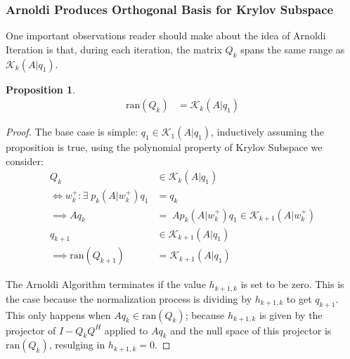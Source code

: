\documentclass[]{article}
\theoremstyle{definition}
\newtheorem{prop}{Proposition}
\begin{document}
        \subsubsection{Arnoldi Produces Orthogonal Basis for Krylov Subspace}
            One important observations reader should make about the idea of Arnoldi Iteration is that, during each iteration, the matrix $Q_k$ spans the same range as $\mathcal K_k(A|q_1)$. 
            \begin{prop}
                \begin{align}
                    \text{ran}(Q_k) &= \mathcal K_k(A|q_1)
                \end{align}
            \end{prop}
            \begin{proof}
                The base case is simple: $q_1 \in \mathcal K_1(A|q_1)$, inductively assuming the proposition is true, using the polynomial property of Krylov Subspace we consider: 
                $$
                \begin{aligned}
                    Q_k &\in \mathcal K_k(A|q_1)
                    \\
                    \iff w_k^+: \exists\; p_k(A|w_k^+)q_1 &= q_k
                    \\
                    \implies Aq_k &= \; Ap_k(A|w_k^+)q_1 \in \mathcal K_{k + 1}(A|w_k^+)
                    \\
                    q_{k + 1} &\in \mathcal K_{k + 1}(A|q_{1})
                    \\
                    \implies \text{ran}(Q_{k + 1}) &= \mathcal K_{k + 1}(A|q_1)
                \end{aligned}
                $$

                The Arnoldi Algorithm terminates if the value $h_{k + 1, k}$ is set to be zero. This is the case because the normalization process is dividing by $h_{k + 1, k}$ to get $q_{k + 1}$. This only happens when $Aq_{k}\in \text{ran}(Q_k)$; because $h_{k +1, k}$ is given by the projector of $I - Q_kQ^H$ applied to $Aq_k$ and the null space of this projector is $\text{ran}(Q_k)$, resulging in $h_{k + 1, k} = 0$. 
            \end{proof}
\end{document}
